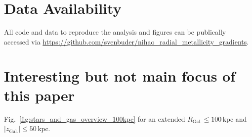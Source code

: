 \documentclass[fleqn,usenatbib]{mnras}
\begin{document}
\section*{Data Availability}

All code and data to reproduce the analysis and figures can be publically accessed via \url{https://github.com/svenbuder/nihao_radial_metallicity_gradients}.







\appendix

\section{Interesting but not main focus of this paper}

Fig.~\ref{fig:stars_and_gas_overview_100kpc} for an extended $R_\mathrm{Gal.} \leq 100\,\mathrm{kpc}$ and $\vert z_\mathrm{Gal.} \vert \leq 50\,\mathrm{kpc}$.
\end{document}
